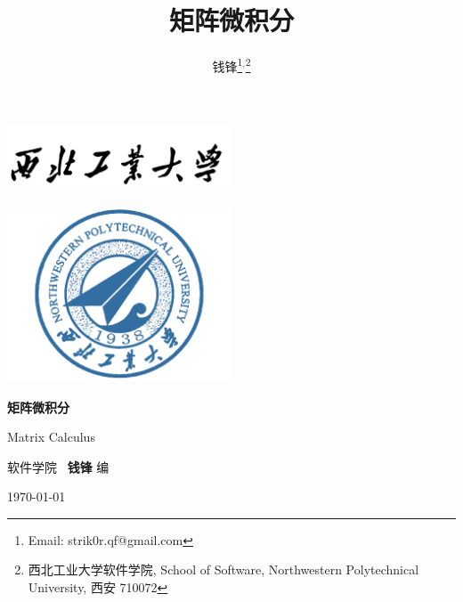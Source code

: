 \documentclass[10pt,UTF8]{book} %
\title{\textbf{矩阵微积分}}
\author{钱锋\thanks{Email: strik0r.qf@gmail.com}${}^,$\thanks{
    西北工业大学软件学院, School of Software, Northwestern Polytechnical University, 西安 710072
}}
\begin{document}


\pagestyle{empty}
\begin{titlepage}
    \thispagestyle{empty}
    \centering
        \vspace*{3cm}
        \includegraphics[width=0.5\textwidth]{pic/npu_2.png}\par
        \vspace{1em}
        \includegraphics[width=0.5\textwidth]{pic/npu_1.png}\par
    \vspace*{1em}
        \begin{center}
            \Huge \heiti \textbf{矩阵微积分}

            Matrix Calculus
        \end{center}

        \vspace{14em}
        \begin{center}
        \songti

        \kaishu 软件学院 \, \heiti\textbf{钱锋} \quad \songti 编
        \vspace{0.5em}

    \today
    \end{center}
\end{titlepage}
\cleardoublepage
\maketitle
\cleardoublepage
\frontmatter
\newpage
\pagestyle{plain}
\makeatother

\pagestyle{plain}
{\tableofcontents}
\newpage
\thispagestyle{empty}
\cleardoublepage %
\end{document}
